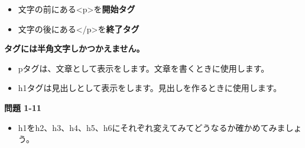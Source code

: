\documentclass[a4paper,12pt]{jarticle}
\begin{document}
\begin{itemize}
	\item 文字の前にある{\textless}p{\textgreater}を\textbf{開始タグ}
	\item 文字の後にある{\textless}/p{\textgreater}を\textbf{終了タグ}
\end{itemize}

\textbf{タグには半角文字しかつかえません。}

\begin{itemize}
	\item pタグは、文章として表示をします。文章を書くときに使用します。

	\item h1タグは見出しとして表示をします。見出しを作るときに使用します。
\end{itemize}


\vfill

{\bfseries
問題 1-11}

\begin{itemize}
\item[]
h1をh2、h3、h4、h5、h6にそれぞれ変えてみてどうなるか確かめてみましょう。
\end{itemize}

\bigskip
\end{document}
